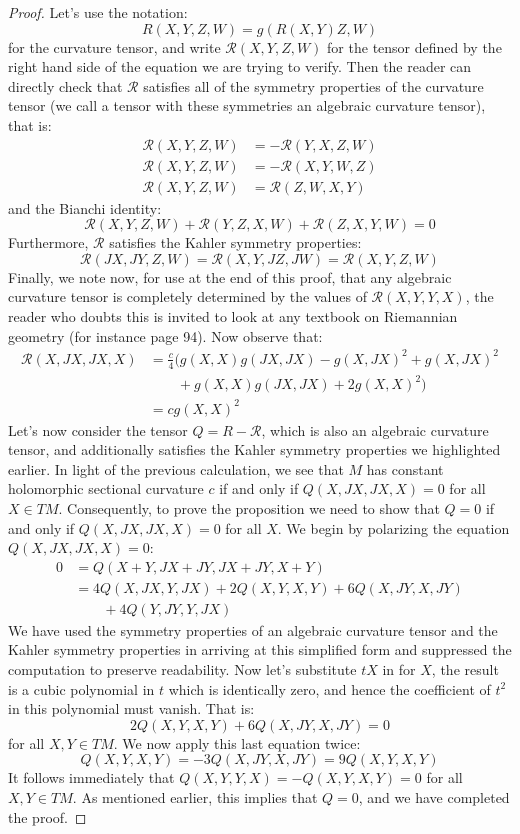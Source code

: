 \documentclass[11pt]{amsart}
\theoremstyle{definition}
\def \Rcurv{ \mathcal{R} }
\begin{document}
\begin{proof}
%
Let's use the notation:
%
$$ R(X,Y,Z,W) = g( R(X,Y)Z, W ) $$
%
for the curvature tensor, and write $\Rcurv (X,Y,Z,W)$ for the tensor defined by the right hand side of the equation we are trying to verify.  Then the reader can directly check that $\Rcurv$ satisfies all of the symmetry properties of the curvature tensor (we call a tensor with these symmetries an algebraic curvature tensor), that is:
%
\begin{align*}
\Rcurv (X,Y,Z,W) &= - \Rcurv (Y,X,Z,W) \\
\Rcurv (X,Y,Z,W) &= - \Rcurv (X,Y,W,Z) \\
\Rcurv (X,Y,Z,W) &= \Rcurv(Z,W,X,Y)
\end{align*}
%
and the Bianchi identity:
$$ \Rcurv (X,Y,Z,W) + \Rcurv (Y,Z,X,W) + \Rcurv (Z,X,Y,W) = 0 $$
%
Furthermore, $\Rcurv$ satisfies the Kahler symmetry properties:
%
$$ \Rcurv( JX, JY, Z, W ) = \Rcurv ( X, Y, JZ, JW ) = \Rcurv ( X,Y,Z,W ) $$
%
Finally, we note now, for use at the end of this proof, that any algebraic curvature tensor is completely determined by the values of $\Rcurv( X,Y,Y,X )$, the reader who doubts this is invited to look at any textbook on Riemannian geometry (for instance \cite{dC} page 94).
%
Now observe that:
%
\begin{align*}
\Rcurv (X, JX, JX, X) &= \frac{c}{4} ( g(X,X)g(JX,JX) - g(X,JX)^2 + g(X, JX)^2 \\
& \qquad + g(X,X)g(JX,JX) + 2 g(X,X)^2 ) \\
&= c g(X,X)^2
\end{align*}
%
Let's now consider the tensor $Q = R - \Rcurv$, which is also an algebraic curvature tensor, and additionally satisfies the Kahler symmetry properties we highlighted earlier.  In light of the previous calculation, we see that $M$ has constant holomorphic sectional curvature $c$ if and only if $Q(X,JX,JX,X) = 0$ for all $X \in TM$.  Consequently, to prove the proposition we need to show that $Q=0$ if and only if $Q(X,JX,JX,X) = 0$ for all $X$.
%
We begin by polarizing the equation $Q(X,JX,JX,X) = 0$:
%
\begin{align*}
0 &= Q ( X + Y, JX + JY, JX + JY, X + Y ) \\
&= 4 Q (X, JX, Y, JX ) +  2 Q (X,Y,X,Y) + 6 Q (X, JY, X, JY) \\
& \qquad + 4 Q ( Y, JY, Y, JX )
\end{align*}
%
We have used the symmetry properties of an algebraic curvature tensor and the Kahler symmetry properties in arriving at this simplified form and suppressed the computation to preserve readability.  Now let's substitute $tX$ in for $X$, the result is a cubic polynomial in $t$ which is identically zero, and hence the coefficient of $t^2$ in this polynomial must vanish.  That is:
%
$$2 Q(X,Y,X,Y) + 6 Q(X, JY, X, JY) = 0 $$
%
for all $X,Y \in TM$.  We now apply this last equation twice:
%
$$ Q(X,Y,X,Y) = - 3 Q(X,JY,X,JY) = 9 Q(X, Y, X, Y) $$
%
It follows immediately that $Q(X,Y,Y,X) = - Q(X,Y,X,Y) = 0$ for all $X,Y \in TM$.  As mentioned earlier, this implies that $Q = 0$, and we have completed the proof.
%
\end{proof}
\end{document}
